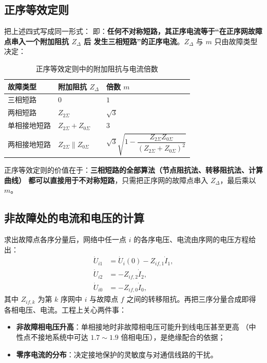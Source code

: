 \subsection{正序等效定则}

把上述四式写成同一形式：
即：\textbf{任何不对称短路，其正序电流等于“在正序网故障点串入一个附加阻抗 $Z_\Delta$ 后
发生三相短路”的正序电流}。$Z_\Delta$ 与 $m$ 只由故障类型决定：

\begin{table}[htbp]
  \centering
  \caption{正序等效定则中的附加阻抗与电流倍数}
  \label{tab:zDelta}
  \small
  \begin{tabular}{@{}lll@{}}
    \toprule
    故障类型 & 附加阻抗 $Z_\Delta$ & 倍数 $m$ \\
    \midrule
    三相短路 & $0$ & $1$ \\
    两相短路 & $Z_{2\Sigma}$ & $\sqrt{3}$ \\
    单相接地短路 & $Z_{2\Sigma}+Z_{0\Sigma}$ & $3$ \\
    两相接地短路 & $Z_{2\Sigma}\parallel Z_{0\Sigma}$ &
      $\sqrt{3}\sqrt{1-\dfrac{Z_{2\Sigma}Z_{0\Sigma}}{\left(Z_{2\Sigma}+Z_{0\Sigma}\right)^{2}}}$ \\
    \bottomrule
  \end{tabular}
\end{table}

正序等效定则的价值在于：\textbf{三相短路的全部算法（节点阻抗法、转移阻抗法、计算曲线）
都可以直接用于不对称短路}，只需把正序网的故障点串入 $Z_\Delta$，最后乘以 $m$。


\subsection{非故障处的电流和电压的计算}

求出故障点各序分量后，网络中任一点 $i$ 的各序电压、电流由序网的电压方程给出：
\begin{align}
  \dot U_{i1}&=\dot U_i(0)-Z_{i f,1}\dot I_1,\\
  \dot U_{i2}&=-Z_{i f,2}\dot I_2,\\
  \dot U_{i0}&=-Z_{i f,0}\dot I_0,
\end{align}
其中 $Z_{if,k}$ 为第 $k$ 序网中 $i$ 与故障点 $f$ 之间的转移阻抗。再把三序分量合成即得
各相电压、电流。工程上关心两件事：
\begin{itemize}
  \item \textbf{非故障相电压升高}：单相接地时非故障相电压可能升到线电压甚至更高
        （中性点不接地系统中可达 $1.7\sim1.9$ 倍相电压），是绝缘配合的依据；
  \item \textbf{零序电流的分布}：决定接地保护的灵敏度与对通信线路的干扰。
\end{itemize}

